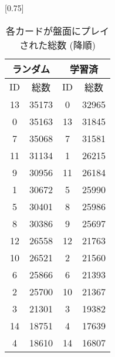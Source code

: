 \documentclass[twocolumn]{jarticle}
\begin{document}
       \begin{table}[t]
         \begin{minipage}{0.50\hsize}
           \centering
           \caption{各カードが盤面にプレイされた総数 (降順)}
            \vspace{-0.3cm}
            \label{table:cardcount}
           \scalebox{0.75}[0.75]{
           \begin{tabular}{|cc|cc|}
             \hline
             \multicolumn{2}{|c|}{ランダム}       & \multicolumn{2}{c|}{学習済}       \\ \hline
             \multicolumn{1}{|c|}{ID} & 総数    & \multicolumn{1}{c|}{ID} & 総数   \\ \hline \hline
             \multicolumn{1}{|c|}{13}  & 35173 & \multicolumn{1}{c|}{0}  & 32965 \\ \hline
             \multicolumn{1}{|c|}{0}  & 35163 & \multicolumn{1}{c|}{13} & 31845 \\ \hline
             \multicolumn{1}{|c|}{7}  & 35068 & \multicolumn{1}{c|}{7}  & 31581 \\ \hline
             \multicolumn{1}{|c|}{11} & 31134 & \multicolumn{1}{c|}{1}  & 26215 \\ \hline
             \multicolumn{1}{|c|}{9} & 30956 & \multicolumn{1}{c|}{11} & 26184 \\ \hline
             \multicolumn{1}{|c|}{1}  & 30672 & \multicolumn{1}{c|}{5}  & 25990 \\ \hline
             \multicolumn{1}{|c|}{5}  & 30401 & \multicolumn{1}{c|}{8}  & 25986 \\ \hline
             \multicolumn{1}{|c|}{8}  & 30386 & \multicolumn{1}{c|}{9}  & 25697 \\ \hline
             \multicolumn{1}{|c|}{12} & 26558 & \multicolumn{1}{c|}{12}  & 21763 \\ \hline
             \multicolumn{1}{|c|}{10} & 26521 & \multicolumn{1}{c|}{2}  & 21560 \\ \hline
             \multicolumn{1}{|c|}{6}  & 25866 & \multicolumn{1}{c|}{6} & 21393 \\ \hline
             \multicolumn{1}{|c|}{2}  & 25700 & \multicolumn{1}{c|}{10}  & 21367 \\ \hline
             \multicolumn{1}{|c|}{3} & 21301 & \multicolumn{1}{c|}{3}  & 19382 \\ \hline
             \multicolumn{1}{|c|}{14}  & 18751 & \multicolumn{1}{c|}{4} & 17639 \\ \hline
             \multicolumn{1}{|c|}{4}  & 18610 & \multicolumn{1}{c|}{14} & 16807 \\ \hline

\end{tabular}}
\end{minipage}
\end{table}
\end{document}
